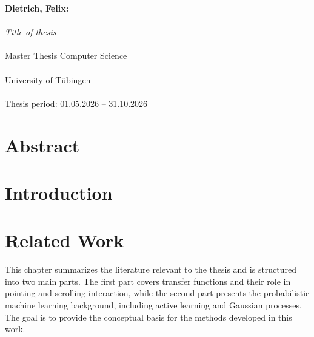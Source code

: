 \documentclass[12pt,a4paper]{report}
\begin{document}

        \thispagestyle{empty}
        \vspace*{\fill}
        \begin{minipage}{11.2cm}
        \textbf{Dietrich, Felix:}\\\\
        \emph{Title of thesis}\\\\ Master Thesis Computer Science\\\\
        University of T\"ubingen\\\\
        Thesis period: 01.05.2026 -- 31.10.2026
        \end{minipage}
        \newpage

        \chapter*{Abstract}







        \newpage

        \tableofcontents
        \newpage




        \chapter{Introduction}

        \chapter{Related Work}

        This chapter summarizes the literature relevant to the thesis and is structured into two main parts. The first part covers transfer functions and their role in pointing and scrolling interaction, while the second part presents the probabilistic machine learning background, including active learning and Gaussian processes. The goal is to provide the conceptual basis for the methods developed in this work.
\end{document}
